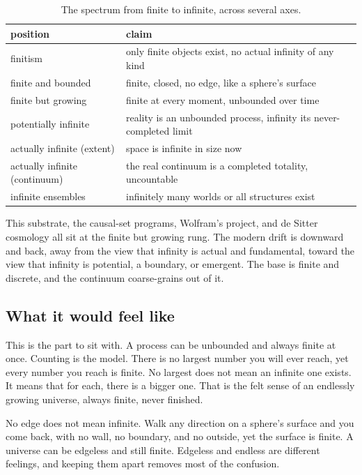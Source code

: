 \begin{table}[ht]
\centering
\begin{tabular}{@{}ll@{}}
\toprule
position & claim \\
\midrule
finitism & only finite objects exist, no actual infinity of any kind \\
finite and bounded & finite, closed, no edge, like a sphere's surface \\
finite but growing & finite at every moment, unbounded over time \\
potentially infinite & reality is an unbounded process, infinity its never-completed limit \\
actually infinite (extent) & space is infinite in size now \\
actually infinite (continuum) & the real continuum is a completed totality, uncountable \\
infinite ensembles & infinitely many worlds or all structures exist \\
\bottomrule
\end{tabular}
\caption{The spectrum from finite to infinite, across several axes.}
\end{table}

This substrate, the causal-set programs, Wolfram's project, and de Sitter cosmology all sit at the finite but
growing rung. The modern drift is downward and back, away from the view that infinity is actual and fundamental,
toward the view that infinity is potential, a boundary, or emergent. The base is finite and discrete, and the
continuum coarse-grains out of it.

\subsection{What it would feel like}

This is the part to sit with. A process can be unbounded and always finite at once. Counting is the model. There
is no largest number you will ever reach, yet every number you reach is finite. No largest does not mean an
infinite one exists. It means that for each, there is a bigger one. That is the felt sense of an endlessly growing
universe, always finite, never finished.

No edge does not mean infinite. Walk any direction on a sphere's surface and you come back, with no wall, no
boundary, and no outside, yet the surface is finite. A universe can be edgeless and still finite. Edgeless and
endless are different feelings, and keeping them apart removes most of the confusion.

